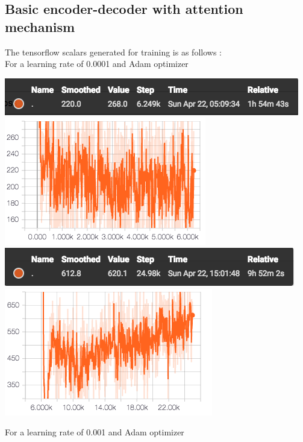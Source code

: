 \documentclass[12pt]{report}
\begin{document}
\subsection{Basic encoder-decoder with attention mechanism}
The tensorflow scalars generated for training is as follows :
\\For a learning rate of 0.0001 and Adam optimizer
\begin{center}
\includegraphics[scale=0.5]{lr_0_0001_attn_train_25k_result.png} \\
\vspace{3mm}
\includegraphics[scale=0.6]{lr_0_0001_attn_train_25k.png}\\
\vspace{3mm}
\includegraphics[scale=0.5]{lr_0_0001_attn_greedy_25k_result.png} \\
\vspace{3mm}
\includegraphics[scale=0.6]{lr_0_0001_attn_greedy_25k.png} 
\end{center}
For a learning rate of 0.001 and Adam optimizer
\end{document}
